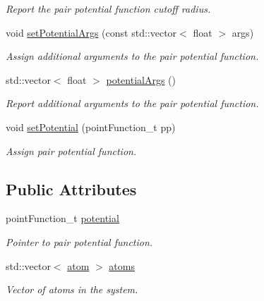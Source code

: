 \begin{DoxyCompactItemize}
\begin{DoxyCompactList}\small\item\em Report the pair potential function cutoff radius. \end{DoxyCompactList}\item 
\hypertarget{classsystem_definition_af0309b6a6b9e68a5e014ed3c74fcc13f}{void \hyperlink{classsystem_definition_af0309b6a6b9e68a5e014ed3c74fcc13f}{set\-Potential\-Args} (const std\-::vector$<$ float $>$ args)}\label{classsystem_definition_af0309b6a6b9e68a5e014ed3c74fcc13f}

\begin{DoxyCompactList}\small\item\em Assign additional arguments to the pair potential function. \end{DoxyCompactList}\item 
\hypertarget{classsystem_definition_ab20c0c30e84fccdf15f54c155d25420f}{std\-::vector$<$ float $>$ \hyperlink{classsystem_definition_ab20c0c30e84fccdf15f54c155d25420f}{potential\-Args} ()}\label{classsystem_definition_ab20c0c30e84fccdf15f54c155d25420f}

\begin{DoxyCompactList}\small\item\em Report additional arguments to the pair potential function. \end{DoxyCompactList}\item 
void \hyperlink{classsystem_definition_a375afbe9e4ffc76793db1b222bc1f941}{set\-Potential} (point\-Function\-\_\-t pp)
\begin{DoxyCompactList}\small\item\em Assign pair potential function. \end{DoxyCompactList}\end{DoxyCompactItemize}
\subsection*{Public Attributes}
\begin{DoxyCompactItemize}
\item 
\hypertarget{classsystem_definition_a4861989c8ca1ddef7ec521499453df3f}{point\-Function\-\_\-t \hyperlink{classsystem_definition_a4861989c8ca1ddef7ec521499453df3f}{potential}}\label{classsystem_definition_a4861989c8ca1ddef7ec521499453df3f}

\begin{DoxyCompactList}\small\item\em Pointer to pair potential function. \end{DoxyCompactList}\item 
\hypertarget{classsystem_definition_ae8814d3f60fc1111af2a3f218a4bfcab}{std\-::vector$<$ \hyperlink{structatom}{atom} $>$ \hyperlink{classsystem_definition_ae8814d3f60fc1111af2a3f218a4bfcab}{atoms}}\label{classsystem_definition_ae8814d3f60fc1111af2a3f218a4bfcab}

\begin{DoxyCompactList}\small\item\em Vector of atoms in the system. \end{DoxyCompactList}\end{DoxyCompactItemize}


